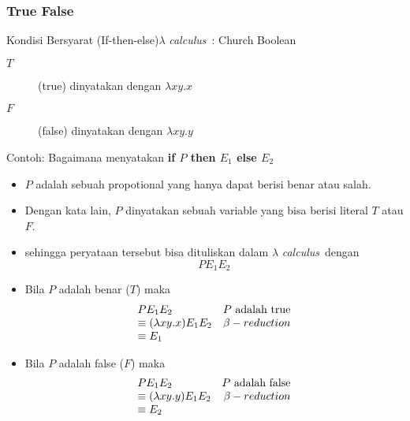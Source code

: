 \documentclass[aspectratio=1610,10pt,handout]{beamer}
\newcommand{\lc}{$\lambda$ {\it calculus}\ }
\begin{document}
\subsubsection{True False}
	\begin{frame}{Kondisi Bersyarat (If-then-else)}{\lc: Church Boolean}

			\begin{description}
				\item [$T$] (true) dinyatakan dengan $\lambda x y. x$
				\item [$F$] (false) dinyatakan dengan $\lambda x y. y$
			\end{description}
			\pause
			Contoh: Bagaimana menyatakan {\bf  if $P$ then $E_1$ else $E_2$}
			\pause
			\begin{itemize}
				\item<2-> $P$ adalah sebuah propotional yang hanya dapat berisi benar atau salah.
				\item<3-> Dengan kata lain, $P$ dinyatakan sebuah variable yang bisa berisi literal $T$ atau $F$.
				\item<4-> sehingga peryataan tersebut bisa dituliskan dalam \lc dengan
				$$P E_1 E_2 $$
				\item<5-> Bila $P$ adalah benar ($T$) maka\[
				 \begin{array}{lr}
				P E_1 E_2 & P $ adalah true$ \\
				\equiv (\lambda x y. x ) E_1 E_2 & \beta-reduction \\
				\equiv E_1 & \\
				 \end{array}
				 \]
				\item<5-> Bila $P$ adalah false ($F$) maka\[
				\begin{array}{lr}
				P E_1 E_2  & P $ adalah false$ \\
				\equiv (\lambda x y. y ) E_1 E_2 & \beta-reduction \\
				\equiv E_2 & \\
				\end{array}
				\]

			\end{itemize}
	\end{frame}
\end{document}

